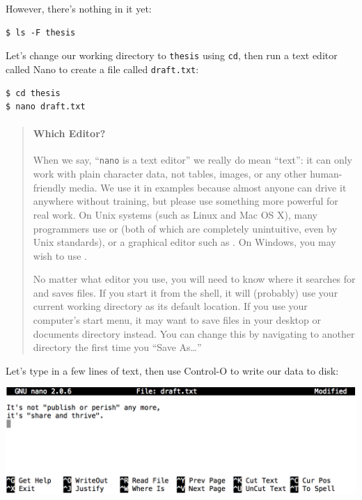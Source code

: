 \documentclass{book}
\begin{document}
However, there's nothing in it yet:

\begin{verbatim}
$ ls -F thesis
\end{verbatim}

Let's change our working directory to \texttt{thesis} using \texttt{cd},
then run a text editor called Nano to create a file called
\texttt{draft.txt}:

\begin{verbatim}
$ cd thesis
$ nano draft.txt
\end{verbatim}

\begin{quote}
\mbox{}\paragraph{Which Editor?}

When we say, ``\texttt{nano} is a text editor'' we really do mean
``text'': it can only work with plain character data, not tables,
images, or any other human-friendly media. We use it in examples because
almost anyone can drive it anywhere without training, but please use
something more powerful for real work. On Unix systems (such as Linux
and Mac OS X), many programmers use
 or
 (both of which are completely
unintuitive, even by Unix standards), or a graphical editor such as
. On Windows, you may wish
to use .

No matter what editor you use, you will need to know where it searches
for and saves files. If you start it from the shell, it will (probably)
use your current working directory as its default location. If you use
your computer's start menu, it may want to save files in your desktop or
documents directory instead. You can change this by navigating to
another directory the first time you ``Save As\ldots{}''
\end{quote}

Let's type in a few lines of text, then use Control-O to write our data
to disk:

\includegraphics{novice/shell/img/nano-screenshot.png}
\end{document}
